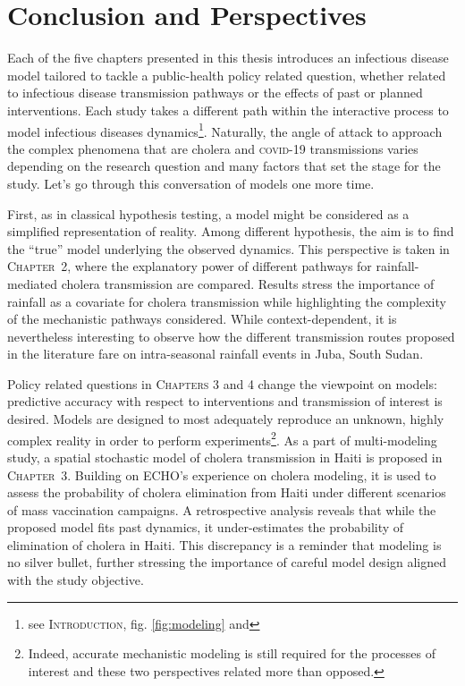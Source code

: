 \chapter*{Conclusion and Perspectives}
Each of the five chapters presented in this thesis introduces an infectious disease model tailored to tackle a public-health policy related question, whether related to infectious disease transmission pathways or the effects of past or planned interventions. Each study takes a different path within the interactive process to model infectious diseases dynamics\footnote{see \textsc{Introduction}, fig. \ref{fig:modeling} and }. Naturally, the angle of attack to approach the complex phenomena that are cholera and \textsc{covid}-19 transmissions varies depending on the research question and many factors that set the stage for the study. Let's go through this conversation of models one more time.

First, as in classical hypothesis testing, a model might be considered as a simplified representation of reality. Among different hypothesis, the aim is to find the ``true'' model underlying the observed dynamics. This perspective is taken in \textsc{Chapter~2}, where the explanatory power of different pathways for rainfall-mediated cholera transmission are compared\cite{Rinaldo:Reassessment20102011:2012, Eisenberg:ExaminingRainfallCholera:2013}. Results stress the importance of rainfall as a covariate for cholera transmission while highlighting the complexity of the mechanistic pathways considered. While context-dependent, it is nevertheless interesting to observe how the different transmission routes proposed in the literature fare on intra-seasonal rainfall events in Juba, South Sudan.

Policy related questions in \textsc{Chapters 3} and 4 change the viewpoint on models: predictive accuracy with respect to interventions and transmission of interest is desired. Models are designed to most adequately reproduce an unknown, highly complex reality in order to perform experiments\footnote{Indeed, accurate mechanistic modeling is still required for the processes of interest and these two perspectives related more than opposed.}. As a part of multi-modeling study\cite{Lee:AchievingCoordinatedNational:2020}, a spatial stochastic model of cholera transmission in Haiti is proposed in \textsc{Chapter~3}. Building on ECHO's experience on cholera modeling\cite{Rinaldo:RiverNetworksEcological:2020a}, it is used to assess the probability of cholera elimination from Haiti under different scenarios of mass vaccination campaigns. A retrospective analysis reveals that while the proposed model fits past dynamics, it under-estimates the probability of elimination of cholera in Haiti. This discrepancy  is a reminder that modeling is no silver bullet, further stressing the importance of careful model design aligned with the study objective. 

